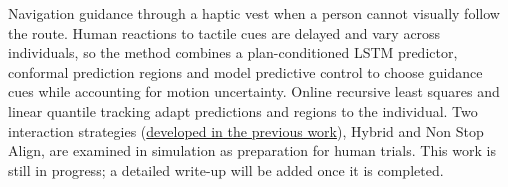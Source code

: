 
\begin{ProjectSummary}
Navigation guidance through a haptic vest when a person cannot visually follow the route.
Human reactions to tactile cues are delayed and vary across individuals, so the method combines
a plan-conditioned LSTM predictor, conformal prediction regions and model predictive control to
choose guidance cues while accounting for motion uncertainty. Online recursive least squares and
linear quantile tracking adapt predictions and regions to the individual. Two interaction
strategies (\href{project:haptic-vest-navigation}{developed in the previous work}), Hybrid and Non Stop Align, are examined in simulation as preparation for human trials.
This work is still in progress; a detailed write-up will be added once it is completed.
\end{ProjectSummary}

\ProjectDocument{}
